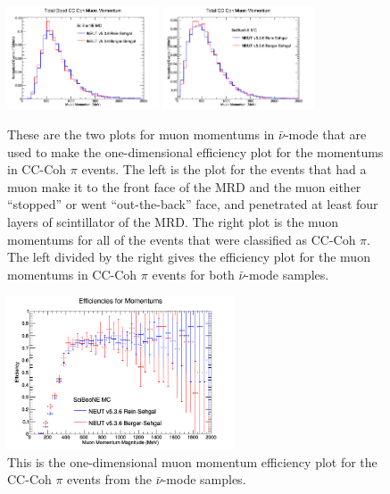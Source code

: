 \documentclass[11pt]{article}
\begin{document}
\begin{figure}[H]
\centering
\includegraphics[width=0.4\textwidth]{ANMCombinedPlotsImages/12-ANMCombinedPlots.png}
\includegraphics[width=0.4\textwidth]{ANMCombinedPlotsImages/14-ANMCombinedPlots.png}
\caption{These are the two plots for muon momentums in $\bar{\nu}$-mode that are used to make the one-dimensional efficiency plot for the momentums in CC-Coh $\pi$ events. The left is the plot for the events that had a muon make it to the front face of the MRD and the muon either ``stopped'' or went ``out-the-back'' face, and penetrated at least four layers of scintillator of the MRD. The right plot is the muon momentums for all of the events that were classified as CC-Coh $\pi$. The left divided by the right gives the efficiency plot for the muon momentums in CC-Coh $\pi$ events for both $\bar{\nu}$-mode samples.}
\label{fig:app:ANMCCCohMuonMom}
\end{figure}

\begin{figure}[H]
\centering
\includegraphics[width=0.6\textwidth]{ANMCombinedPlotsImages/18-ANMCombinedPlots.png}
\caption{This is the one-dimensional muon momentum efficiency plot for the CC-Coh $\pi$ events from the $\bar{\nu}$-mode samples.}
\label{fig:app:ANMCCCohMom1DEff}
\end{figure}
\end{document}
